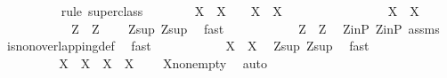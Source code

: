 \begin{isabellebody}
\ \ \ \ \ \ \ \ \isamarkupfalse%
\ {\isacharparenleft}rule\ super{\isacharunderscore}class{\isacharparenright}\isanewline
\ \ \ \ \ \ \isamarkupfalse%
\ {\isachardoublequoteopen}X{}\ {\isasyminter}\ X{}\ {\isasymnoteq}\ {\isacharbraceleft}{\isacharbraceright}\ {\isasymlongrightarrow}\ X{}\ {\isacharequal}\ X{}{\isachardoublequoteclose}\isanewline
\ \ \ \ \ \ \isamarkupfalse%
\isanewline
\ \ \ \ \ \ \ \ \isamarkupfalse%
\ {\isachardoublequoteopen}X{}\ {\isasyminter}\ X{}\ {\isasymnoteq}\ {\isacharbraceleft}{\isacharbraceright}{\isachardoublequoteclose}\isanewline
\ \ \ \ \ \ \ \ \isamarkupfalse%
\ \isamarkupfalse%
\ {\isachardoublequoteopen}Z{}\ {\isasyminter}\ Z{}\ {\isasymnoteq}\ {\isacharbraceleft}{\isacharbraceright}{\isachardoublequoteclose}\ \isamarkupfalse%
\ Z{}{\isacharunderscore}sup\ Z{}{\isacharunderscore}sup\ \isamarkupfalse%
\ fast\isanewline
\ \ \ \ \ \ \ \ \isamarkupfalse%
\ \isamarkupfalse%
\ {\isachardoublequoteopen}Z{}\ {\isacharequal}\ Z{}{\isachardoublequoteclose}\ \isamarkupfalse%
\ Z{}{\isacharunderscore}in{\isacharunderscore}P\ Z{}{\isacharunderscore}in{\isacharunderscore}P\ assms\ \isamarkupfalse%
\ is{\isacharunderscore}non{\isacharunderscore}overlapping{\isacharunderscore}def\ \isamarkupfalse%
\ fast\isanewline
\ \ \ \ \ \ \ \ \isamarkupfalse%
\ \isamarkupfalse%
\ {\isachardoublequoteopen}X{}\ {\isacharequal}\ X{}{\isachardoublequoteclose}\ \isamarkupfalse%
\ Z{}{\isacharunderscore}sup\ Z{}{\isacharunderscore}sup\ \isamarkupfalse%
\ fast\isanewline
\ \ \ \ \ \ \isamarkupfalse%
\isanewline
\ \ \ \ \ \ \isamarkupfalse%
\ \isamarkupfalse%
\ {\isachardoublequoteopen}X{}\ {\isacharequal}\ X{}\ {\isasymlongrightarrow}\ X{}\ {\isasyminter}\ X{}\ {\isasymnoteq}\ {\isacharbraceleft}{\isacharbraceright}{\isachardoublequoteclose}\ \isamarkupfalse%
\ X{}{\isacharunderscore}non{\isacharunderscore}empty\ \isamarkupfalse%
\ auto\isanewline
\ \ \ \ \ \ \isamarkupfalse%
\ \isamarkupfalse%

\end{isabellebody}
